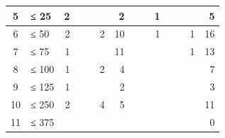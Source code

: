 {\begin{table}
\begin{tabular}{
	c
	l
	r r c
	r r c
	r r c
	r r
	r
}
\midrule

5
	& ≤ 25
	& 2 %
	& %
	& %
	& %
	& 2 %
	& %
	& %
	& 1 %
	& %
	& %
	& %
	& 5
	\\

\midrule

6
	& ≤ 50
	& 2 %
	& %
	& %
	& 2 %
	& 10 %
	& %
	& %
	& 1 %
	& %
	& %
	& 1 %
	& 16
	\\

\midrule

7
	& ≤ 75
	& 1 %
	& %
	& %
	& %
	& 11 %
	& %
	& %
	& %
	& %
	& %
	& 1 %
	& 13
	\\

\midrule

8
	& ≤ 100
	& 1 %
	& %
	& %
	& 2 %
	& 4 %
	& %
	& %
	& %
	& %
	& %
	& %
	& 7
	\\

\midrule

9
	& ≤ 125
	& 1 %
	& %
	& %
	& %
	& 2 %
	& %
	& %
	& %
	& %
	& %
	& %
	& 3
	\\

\midrule

10
	& ≤ 250
	& 2 %
	& %
	& %
	& 4 %
	& 5 %
	& %
	& %
	& %
	& %
	& %
	& %
	& 11
	\\

\midrule

11
	& ≤ 375
	& %
	& %
	& %
	& %
	& %
	& %
	& %
	& %
	& %
	& %
	& %
	& 0
	\\


\end{tabular}
\end{table}}
